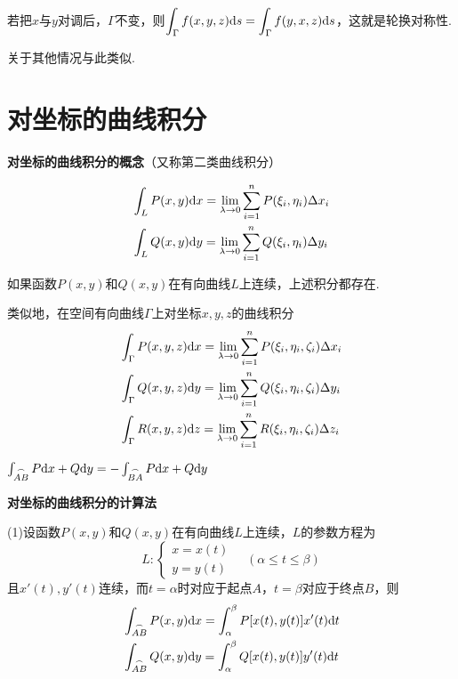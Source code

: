 若把$x$与$y$对调后，$\Gamma$不变，则$\displaystyle\int_{\Gamma}f(x,y,z)\mathrm{d} s=\int_{\Gamma}f(y,x,z)\mathrm{d} s$，这就是轮换对称性.

关于其他情况与此类似.

\section{对坐标的曲线积分}

\textbf{对坐标的曲线积分的概念}（又称第二类曲线积分）

\begin{align*}
    & \int_{L}P(x,y)\mathrm{d} x=\lim_{\lambda\rightarrow 0}\sum_{i=1}^{n} P(\xi_i, \eta_i)\Delta x_{i} \\
    & \int_{L}Q(x,y)\mathrm{d} y=\lim_{\lambda\rightarrow 0}\sum_{i=1}^{n} Q(\xi_i, \eta_i)\Delta y_{i}
\end{align*}

如果函数$P(x,y)$和$Q(x,y)$在有向曲线$L$上连续，上述积分都存在.

类似地，在空间有向曲线$\Gamma$上对坐标$x,y,z$的曲线积分
\begin{align*}
    & \int_{\Gamma}P(x,y,z)\mathrm{d} x=\lim_{\lambda\rightarrow 0}\sum_{i=1}^{n} P(\xi_i, \eta_i, \zeta_i)\Delta x_{i} \\
    & \int_{\Gamma}Q(x,y,z)\mathrm{d} y=\lim_{\lambda\rightarrow 0}\sum_{i=1}^{n} Q(\xi_i, \eta_i, \zeta_i)\Delta y_{i} \\
    & \int_{\Gamma}R(x,y,z)\mathrm{d} z=\lim_{\lambda\rightarrow 0}\sum_{i=1}^{n} R(\xi_i, \eta_i, \zeta_i)\Delta z_{i}
\end{align*}

\begin{property}
    $\int_{\overset{\Large\frown}{AB}}P\mathrm{d} x+Q\mathrm{d} y=-\int_{\overset{\Large\frown}{BA}}P\mathrm{d} x+Q\mathrm{d} y$
\end{property}

\textbf{对坐标的曲线积分的计算法}

(1)设函数$P(x,y)$和$Q(x,y)$在有向曲线$L$上连续，$L$的参数方程为
\begin{equation*}
    L:
    \begin{cases}
        x=x(t) \\
        y=y(t)
    \end{cases}
    \quad (\alpha\leq t\leq \beta)
\end{equation*}
且$x'(t),y'(t)$连续，而$t=\alpha$时对应于起点$A$，$t=\beta$对应于终点$B$，则
\begin{align*}
    & \int_{\overset{\Large\frown}{AB}}P(x,y)\mathrm{d} x=\int_{\alpha}^{\beta} P[x(t),y(t)]x'(t)\mathrm{d} t \\
    & \int_{\overset{\Large\frown}{AB}}Q(x,y)\mathrm{d} y=\int_{\alpha}^{\beta} Q[x(t),y(t)]y'(t)\mathrm{d} t
\end{align*}

